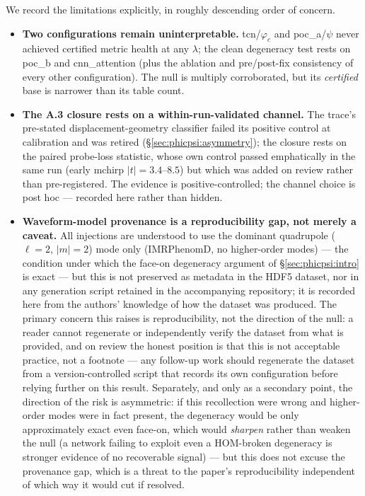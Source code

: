 We record the limitations explicitly, in roughly descending order of concern.
\begin{itemize}
\item \textbf{Two configurations remain uninterpretable.} tcn/$\varphi_c$ and poc\_a/$\psi$ never achieved certified metric health at any $\lambda$; the clean degeneracy test rests on poc\_b and cnn\_attention (plus the ablation and pre/post-fix consistency of every other configuration).
The null is multiply corroborated, but its \emph{certified} base is narrower than its table count.
\item \textbf{The A.3 closure rests on a within-run-validated channel.}
The trace's pre-stated displacement-geometry classifier failed its positive control at calibration and was retired (\S\ref{sec:phicpsi:asymmetry}); the closure rests on the paired probe-loss statistic, whose own control passed emphatically in the same run (early mchirp $|t| = 3.4$--$8.5$) but which was added on review rather than pre-registered.
The evidence is positive-controlled; the channel choice is post hoc --- recorded here rather than hidden.
\item \textbf{Waveform-model provenance is a reproducibility gap, not merely a caveat.}
All injections are understood to use the dominant quadrupole ($\ell=2$, $|m|=2$) mode only (IMRPhenomD, no higher-order modes) --- the condition under which the face-on degeneracy argument of \S\ref{sec:phicpsi:intro} is exact --- but this is not preserved as metadata in the HDF5 dataset, nor in any generation script retained in the accompanying repository; it is recorded here from the authors' knowledge of how the dataset was produced.
The primary concern this raises is reproducibility, not the direction of the null: a reader cannot regenerate or independently verify the dataset from what is provided, and on review the honest position is that this is not acceptable practice, not a footnote --- any follow-up work should regenerate the dataset from a version-controlled script that records its own configuration before relying further on this result.
Separately, and only as a secondary point, the direction of the risk is asymmetric: if this recollection were wrong and higher-order modes were in fact present, the degeneracy would be only approximately exact even face-on, which would \emph{sharpen} rather than weaken the null (a network failing to exploit even a HOM-broken degeneracy is stronger evidence of no recoverable signal) --- but this does not excuse the provenance gap, which is a threat to the paper's reproducibility independent of which way it would cut if resolved.

\end{itemize}
